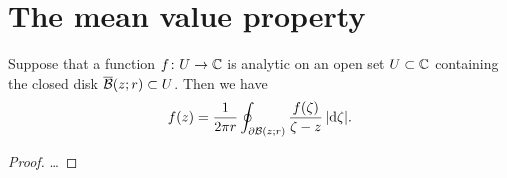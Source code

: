 \section{The mean value property}

\begin{theorem}
  \label{thm:mean_value_property}
  Suppose that a function $f \colon U \to \bC$ is analytic on an open
  set $U \subset \bC$ containing the closed disk $\CDiskRC{r}{z} \subset U$.
  Then we have
  \begin{align*}
    f(z) = \frac{1}{2 \pi r} \oint_{\bdry \DiskRC{r}{z}}
            \frac{f(\zeta)}{\zeta - z} \, |\ud \zeta| .
  \end{align*}
\end{theorem}
\begin{proof}
  \ldots
\end{proof}
